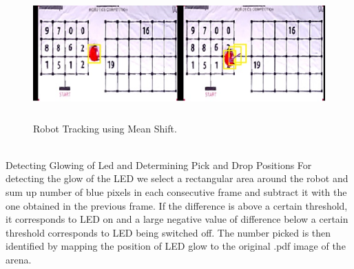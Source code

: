 \documentclass[a4paper,12pt,oneside]{book}
\begin{document}
    \begin{figure}[h!]
		\includegraphics[width=1\linewidth, height=5cm]{ROI1.jpg}
		\centering
		\caption{Robot Tracking using Mean Shift.}
	\end{figure}\\
Detecting Glowing of Led and Determining Pick and Drop Positions
For detecting the glow of the LED we select a rectangular area around the robot and sum up number of blue pixels in each consecutive frame and subtract it with the one obtained in the previous frame. If the difference is above a certain threshold, it corresponds to LED on and a large negative value of difference below a certain threshold corresponds to LED being switched off. The number picked is then identified by mapping the position of LED glow to the original .pdf image of the arena.  
\end{document}
